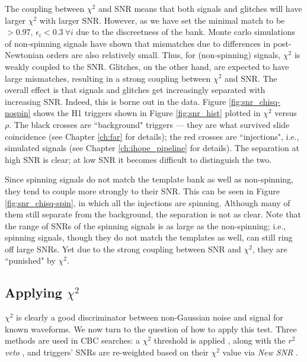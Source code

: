 The coupling between $\chi^2$ and \ac{SNR} means that both signals and glitches will have larger $\chi^2$ with larger \ac{SNR}. However, as we have set the minimal match to be $> 0.97$, $\epsilon_i < 0.3~\forall i$ due to the discreetness of the bank. Monte carlo simulations of non-spinning signals have shown that mismatches due to differences in post-Newtonian orders are also relatively small. Thus, for (non-spinning) signals, $\chi^2$ is weakly coupled to the \ac{SNR}. Glitches, on the other hand, are expected to have large mismatches, resulting in a strong coupling between $\chi^2$ and \ac{SNR}. The overall effect is that signals and glitches get increasingly separated with increasing \ac{SNR}. Indeed, this is borne out in the data. Figure \ref{fig:snr_chisq-nospin} shows the H1 triggers shown in Figure \ref{fig:snr_hist} plotted in $\chi^2$ versus $\rho$. The black crosses are ``background" triggers --- they are what survived slide coincidence (see Chapter \ref{ch:far} for details); the red crosses are ``injections", i.e., simulated signals (see Chapter \ref{ch:ihope_pipeline} for details). The separation at high \ac{SNR} is clear; at low \ac{SNR} it becomes difficult to distinguish the two.

Since spinning signals do not match the template bank as well as non-spinning, they tend to couple more strongly to their \ac{SNR}. This can be seen in Figure \ref{fig:snr_chisq-spin}, in which all the injections are spinning. Although many of them still separate from the background, the separation is not as clear. Note that the range of \acp{SNR} of the spinning signals is as large as the non-spinning; i.e., spinning signals, though they do not match the templates as well, can still ring off large \acp{SNR}. Yet due to the strong coupling between \ac{SNR} and $\chi^2$, they are ``punished" by $\chi^2$. 

\subsection{Applying $\chi^2$}

$\chi^2$ is clearly a good discriminator between non-Gaussian noise and signal for known waveforms. We now turn to the question of how to apply this test. Three methods are used in \ac{CBC} searches: a $\chi^2$ threshold is applied \cite{Brown}, along with the \emph{$r^2$ veto} \cite{Rodriguez:2007, Keppel:thesis}, and triggers' \acp{SNR} are re-weighted based on their $\chi^2$ value via \emph{New SNR} \cite{Collaboration:S6CBClowmass}.

